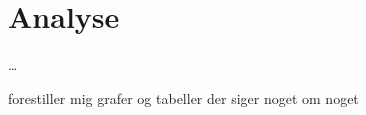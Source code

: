 \part{Analyse}\label{part:analysis}

\ldots

forestiller mig grafer og tabeller der siger noget om noget
